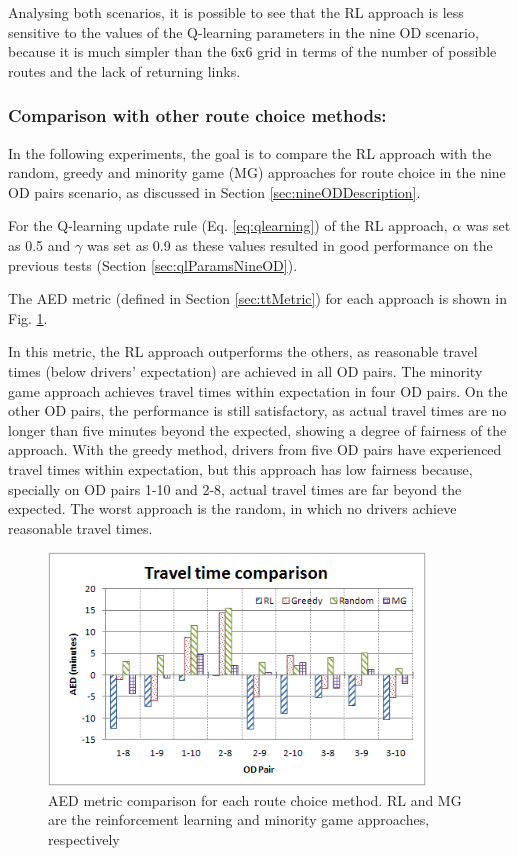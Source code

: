 \documentclass{RITA}
\begin{document}
Analysing both scenarios, it is possible to see that the RL approach is less sensitive to the values of the Q-learning parameters in the nine OD scenario, because it is much simpler than the 6x6 grid in terms of the number of possible routes and the lack of returning links. 

\subsubsection{Comparison with other route choice methods:}
\label{sec:comparison}
In the following experiments, the goal is to compare the RL approach with the random, greedy and minority game (MG) approaches for route choice in the nine OD pairs scenario, as discussed in Section \ref{sec:nineODDescription}.

For the Q-learning update rule (Eq. \ref{eq:qlearning}) of the RL approach, $\alpha$ was set as 0.5 and $\gamma $ was set as 0.9 as these values resulted in good performance on the previous tests (Section \ref{sec:qlParamsNineOD}).

The AED metric (defined in Section \ref{sec:ttMetric}) for each approach is shown in Fig. \ref{fig:travelTimeComparison}. 

In this metric, the RL approach outperforms the others, as reasonable travel times (below drivers' expectation) are achieved in all OD pairs. The minority game approach achieves travel times within expectation in four OD pairs. On the other OD pairs, the performance is still satisfactory, as actual travel times are no longer than five minutes beyond the expected, showing a degree of fairness of the approach. With the greedy method, drivers from five OD pairs have experienced travel times within expectation, but this approach has low fairness because, specially on OD pairs 1-10 and 2-8, actual travel times are far beyond the expected. The worst approach is the random, in which no drivers achieve reasonable travel times.

\begin{figure}[ht]
    \centerline{\includegraphics[width=10cm]{img/travelTimeComparison-hatched.png}}
    \caption{AED metric comparison for each route choice method. RL and MG are the reinforcement learning and minority game approaches, respectively}
    \label{fig:travelTimeComparison}
\end{figure}
\end{document}

